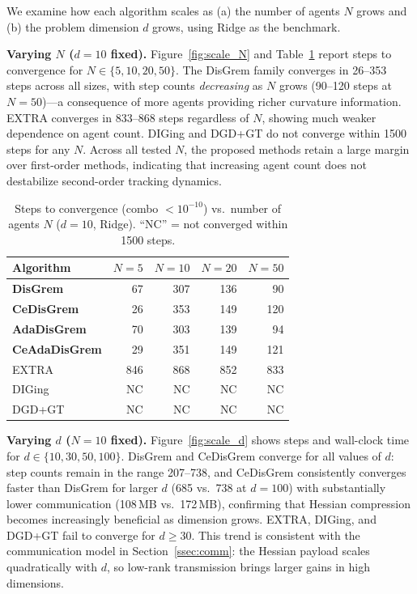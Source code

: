 \documentclass[11pt,a4paper]{article}
\begin{document}
	We examine how each algorithm scales as (a) the number of agents $N$ grows and
	(b) the problem dimension $d$ grows, using Ridge as the benchmark.
	
	\noindent\textbf{Varying $N$ ($d=10$ fixed).}
	Figure~\ref{fig:scale_N} and Table~\ref{tab:scale_N} report steps to convergence for
	$N\in\{5,10,20,50\}$.
	The DisGrem family converges in 26--353 steps across all sizes, with step counts
	\emph{decreasing} as $N$ grows (90--120 steps at $N=50$)---a consequence of more agents
	providing richer curvature information.
	EXTRA converges in 833--868 steps regardless of $N$, showing much weaker dependence on agent count.
	DIGing and DGD+GT do not converge within 1500 steps for any $N$.
	Across all tested $N$, the proposed methods retain a large margin over first-order methods,
	indicating that increasing agent count does not destabilize second-order tracking dynamics.
	
	\begin{table}[h]
		\centering
		\caption{Steps to convergence (combo $<10^{-10}$) vs.\ number of agents $N$
			($d=10$, Ridge). ``NC'' = not converged within 1500 steps.}
		\label{tab:scale_N}
		\begin{tabular}{lrrrr}
			\toprule
			Algorithm      & $N=5$ & $N=10$ & $N=20$ & $N=50$ \\
			\midrule
			\textbf{DisGrem}    & 67  & 307 & 136 & 90  \\
			\textbf{CeDisGrem}  & 26  & 353 & 149 & 120 \\
			\textbf{AdaDisGrem} & 70  & 303 & 139 & 94  \\
			\textbf{CeAdaDisGrem} & 29 & 351 & 149 & 121 \\
			EXTRA               & 846 & 868 & 852 & 833 \\
			DIGing              & NC  & NC  & NC  & NC  \\
			DGD+GT              & NC  & NC  & NC  & NC  \\
			\bottomrule
		\end{tabular}
	\end{table}
	
	\noindent\textbf{Varying $d$ ($N=10$ fixed).}
	Figure~\ref{fig:scale_d} shows steps and wall-clock time for $d\in\{10,30,50,100\}$.
	DisGrem and CeDisGrem converge for all values of $d$:
	step counts remain in the range 207--738, and CeDisGrem consistently converges faster
	than DisGrem for larger $d$ (685 vs.\ 738 at $d=100$) with substantially lower
	communication (108\,MB vs.\ 172\,MB), confirming that Hessian compression becomes
	increasingly beneficial as dimension grows.
	EXTRA, DIGing, and DGD+GT fail to converge for $d\ge30$.
	This trend is consistent with the communication model in Section~\ref{ssec:comm}:
	the Hessian payload scales quadratically with $d$, so low-rank transmission brings larger gains
	in high dimensions.
	
\end{document}
